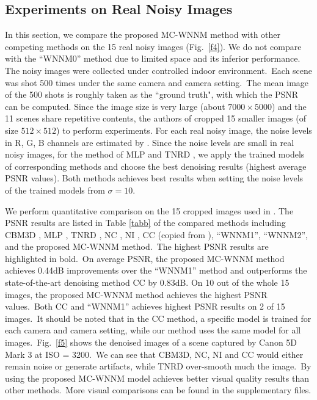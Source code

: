 \documentclass[10pt,twocolumn,letterpaper,sort&compress]{article}
\begin{document}
\subsection{Experiments on Real Noisy Images}

In this section, we compare the proposed MC-WNNM method with other competing methods on the 15 real noisy images (Fig.\ \ref{f4}). We do not compare with the ``WNNM0'' method due to limited space and its inferior performance. The noisy images were collected under controlled indoor environment.\ Each scene was shot 500 times under the same camera and camera setting.\ The mean image of the 500 shots is roughly taken as the ``ground truth", with which the PSNR can be computed. Since the image size is very large (about $7000\times5000$) and the 11 scenes share repetitive contents, the authors of \cite{crosschannel2016} cropped 15 smaller images (of size $512\times512$) to perform experiments. For each real noisy image, the noise levels in R, G, B channels are estimated by \cite{Chen2015ICCV}. Since the noise levels are small in real noisy images, for the method of MLP \cite{mlp} and TNRD \cite{chen2015learning}, we apply the trained models of corresponding methods and choose the best denoising results (highest average PSNR values). Both methods achieves best results when setting the noise levels of the trained models from $\sigma=10$.  

We perform quantitative comparison on the 15 cropped images used in \cite{crosschannel2016}. The PSNR results are listed in Table \ref{tabb} of the compared methods including CBM3D \cite{cbm3d}, MLP \cite{mlp}, TNRD \cite{chen2015learning}, NC \cite{noiseclinic,ncwebsite}, NI \cite{neatimage},
CC \cite{crosschannel2016} (copied from \cite{crosschannel2016}), ``WNNM1'', ``WNNM2'', and the proposed MC-WNNM method.\ The highest PSNR results are highlighted in bold.\ On average PSNR, the proposed MC-WNNM method achieves 0.44dB improvements over the ``WNNM1'' method and outperforms the state-of-the-art denoising method CC \cite{crosschannel2016} by 0.83dB. On 10 out of the whole 15 images, the proposed MC-WNNM method achieves the highest PSNR values.\ Both CC and ``WNNM1'' achieves highest PSNR results on 2 of 15 images.\ It should be noted that in the CC method, a specific model is trained for each camera and camera setting, while our method uses the same model for all images.\ Fig.\ \ref{f5} shows the denoised images of a scene captured by Canon 5D Mark 3 at ISO = 3200.\ We can see that CBM3D, NC, NI and CC would either remain noise or generate artifacts, while TNRD over-smooth much the image.\ By using the proposed MC-WNNM model achieves better visual quality results than other methods.\ More visual comparisons can be found in the supplementary files.
\end{document}
